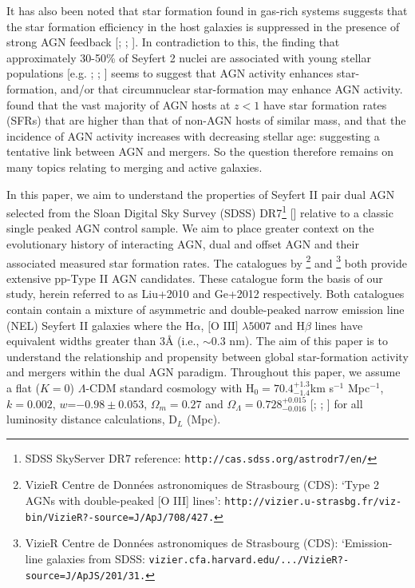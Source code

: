 It has also been noted that star formation found in gas-rich systems suggests that the star formation efficiency in the host galaxies is suppressed in the presence of strong AGN feedback [\cite{1999ApSS.266..207M}; \cite{2004AAS...204.4905B}; \cite{Di_Matteo_2005}]. In contradiction to this, the finding that approximately 30-50\% of Seyfert 2 nuclei are associated with young stellar populations [e.g. \cite{Delgado_2001}; \cite{Storchi_Bergmann_2001}; \cite{Sarzi_2006}] seems to suggest that AGN activity enhances star-formation, and/or that circumnuclear star-formation may enhance AGN activity. \cite{Silverman_2009} found that the vast majority of AGN hosts at $z<1$ have star formation rates (SFRs) that are higher than that of non-AGN hosts of similar mass, and that the incidence of AGN activity increases with decreasing stellar age: suggesting a tentative link between AGN and mergers. So the question therefore remains on many topics relating to merging and active galaxies.

In this paper, we aim to understand the properties of Seyfert II pair dual AGN selected from the Sloan Digital Sky Survey (SDSS) DR7\footnote{\tiny{SDSS SkyServer DR7 reference: \tt{http://cas.sdss.org/astrodr7/en/}}} [\cite{2009ApJS..182..543A}] relative to a classic single peaked AGN control sample. We aim to place greater context on the evolutionary history of interacting AGN, dual and offset AGN and their associated measured star formation rates. The catalogues by \cite{Liu_2009}\footnote{\tiny{VizieR Centre de Donn\'{e}es astronomiques de Strasbourg (CDS): `Type 2 AGNs with double-peaked [O III] lines': \tt{http://vizier.u-strasbg.fr/viz-bin/VizieR?-source=J/ApJ/708/427}.}} and \cite{Ge_Hu_Wang_Bai_Zhang_2012}\footnote{\tiny{VizieR Centre de Donn\'{e}es astronomiques de Strasbourg (CDS): `Emission-line galaxies from SDSS: \tt{vizier.cfa.harvard.edu/.../VizieR?-source=J/ApJS/201/31}.}} both provide extensive pp-Type II AGN candidates. These catalogue form the basis of our study, herein referred to as Liu+2010 and Ge+2012 respectively. Both catalogues contain contain a mixture of asymmetric and double-peaked narrow emission line (NEL) Seyfert II galaxies where the $\text{H}\alpha$, $\text{[O III]}$ $\lambda{5007}$ and $\text{H}\beta$ lines have equivalent widths greater than 3\AA{ }(i.e., $\sim{0.3}$ nm). The aim of this paper is to understand the relationship and propensity between global star-formation activity and mergers within the dual AGN paradigm. Throughout this paper, we assume a flat ($K=0$) $\Lambda$-CDM standard cosmology with $\text{H}_0={70.4}^{+1.3}_{-1.4}$km s$^{−1}$ Mpc$^{−1}$, $k={0.002}$, $w$=$-0.98\pm{0.053}$, ${\Omega_{m}}={0.27}$ and ${\Omega_{\Lambda}}={{0.728}^{+0.015}_{-0.016}}$ [\cite{Spergel_2003}; \cite{Reid_2010}; \cite{Jarosik_2011}] for all luminosity distance calculations, $\text{D}_L$ (Mpc).
  
  
  
  
  
  
  
  